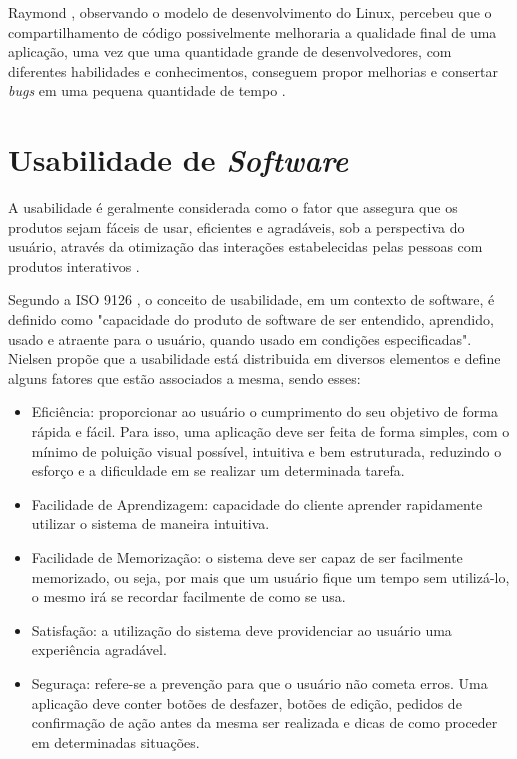 Raymond \cite{raymond1999}, observando o modelo de desenvolvimento do Linux, percebeu que o compartilhamento de código possivelmente melhoraria a qualidade final de uma aplicação, uma vez que uma quantidade grande de desenvolvedores, com diferentes habilidades e conhecimentos, conseguem propor melhorias e consertar \textit{bugs} em uma pequena quantidade de tempo \cite{meirelles2013}.

\section{Usabilidade de \textit{Software}}
A usabilidade é geralmente considerada como o fator que assegura que
os produtos sejam fáceis de usar, eficientes e agradáveis, sob a
perspectiva do usuário, através da otimização das interações
estabelecidas pelas pessoas com produtos interativos \cite{rogers_2013}.

Segundo a ISO 9126 \cite{iso9126}, o conceito de usabilidade, em um contexto de software, é definido como "capacidade do produto de software de ser entendido, aprendido, usado e atraente para o usuário, quando usado em condições especificadas". Nielsen \cite{nielsen_1994} propõe que a usabilidade está distribuida em diversos elementos e define alguns fatores que estão associados a mesma, sendo esses:

\begin{itemize}
    \item Eficiência: proporcionar ao usuário o cumprimento do seu objetivo de forma rápida e fácil. Para isso, uma aplicação deve ser feita de forma simples, com o mínimo de poluição visual possível, intuitiva e bem estruturada, reduzindo o esforço e a dificuldade em se realizar um determinada tarefa.
    \item Facilidade de Aprendizagem: capacidade do cliente aprender rapidamente utilizar o sistema de maneira intuitiva.
    \item Facilidade de Memorização: o sistema deve ser capaz de ser facilmente memorizado, ou seja, por mais que um usuário fique um tempo sem utilizá-lo, o mesmo irá se recordar facilmente de como se usa.
    \item Satisfação: a utilização do sistema deve providenciar ao usuário uma experiência agradável.
    \item Seguraça: refere-se a prevenção para que o usuário não cometa erros. Uma aplicação deve conter botões de desfazer, botões de edição, pedidos de confirmação de ação antes da mesma ser realizada e dicas de como proceder em determinadas situações.
\end{itemize}

